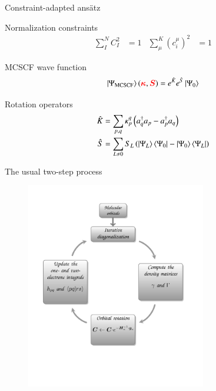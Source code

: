 \documentclass[10pt]{beamer}
\begin{document}
\begin{frame}{Constraint-adapted ans\"atz}
  \pause[1]
  \begin{block}{Normalization constraints}
    \begin{align}
      \label{eq:constraint}
      \sum_I^N C^2_I &= 1 & \sum^K_\mu (c_i^\mu)^2 &= 1
    \end{align}
  \end{block}
  \pause[2]
  \begin{block}{MCSCF wave function}
    \begin{equation}
      \label{eq:mcscf_wf}
      \ket{\Psi_{\text{MCSCF}}}(\textcolor{red}{\bm{\kappa}},\textcolor{red}{\bm{S}})=e^{\Hat{K}}e^{\Hat{S}}\ket{\Psi_0}
    \end{equation}
  \end{block}

  \begin{block}{Rotation operators}
    \begin{align}
      \Hat{K} &= \sum_{p,q} \kappa_p^q \left( a_{q}^\dagger a_{p} - a_{p}^\dagger a_{q} \right)  \\
      \Hat{S} &= \sum_{L \neq 0} S_{L}\left(\ket{\Psi_L}\bra{\Psi_0}-\ket{\Psi_0}\bra{\Psi_L}\right)
    \end{align}
  \end{block}

\end{frame}

\begin{frame}{The usual two-step process}
  \begin{figure}
    \includegraphics[width=0.7\textwidth]{two-step-process.pdf}
  \end{figure}
\end{frame}
\end{document}
